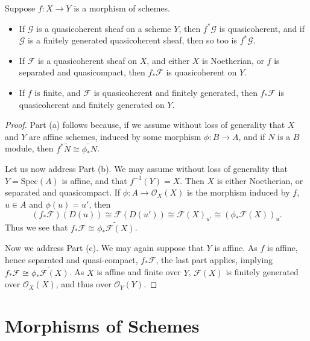 \begin{theorem}
    Suppose $f: X \to Y$ is a morphism of schemes.
    \begin{itemize}
        \item If $\mathcal{G}$ is a quasicoherent sheaf on a scheme $Y$, then $f^* \mathcal{G}$ is quasicoherent, and if $\mathcal{G}$ is a finitely generated quasicoherent sheaf, then so too is $f^* \mathcal{G}$.
        \item If $\mathcal{F}$ is a quasicoherent sheaf on $X$, and either $X$ is Noetherian, or $f$ is separated and quasicompact, then $f_* \mathcal{F}$ is quasicoherent on $Y$.
        \item If $f$ is finite, and $\mathcal{F}$ is quasicoherent and finitely generated, then $f_* \mathcal{F}$ is quasicoherent and finitely generated on $Y$.
    \end{itemize}
\end{theorem}
\begin{proof}
    Part (a) follows because, if we assume without loss of generality that $X$ and $Y$ are affine schemes, induced by some morphism $\phi: B \to A$, and if $N$ is a $B$ module, then $f^* \widetilde{N} \cong \widetilde{\phi_* N}$.

    Let us now address Part (b). We may assume without loss of generality that $Y = \text{Spec}(A)$ is affine, and that $f^{-1}(Y) = X$. Then $X$ is either Noetherian, or separated and quasicompact. If $\phi: A \to \mathcal{O}_X(X)$ is the morphism induced by $f$, $u \in A$ and $\phi(u) = u'$, then
    \[ (f_* \mathcal{F})(D(u)) \cong \mathcal{F}(D(u')) \cong \mathcal{F}(X)_{u'} \cong ( \phi_* \mathcal{F}(X) )_u. \]
    Thus we see that $f_* \mathcal{F} \cong \widetilde{\phi_* \mathcal{F}(X)}$.

    Now we address Part (c). We may again suppose that $Y$ is affine. As $f$ is affine, hence separated and quasi-compact, $f_* \mathcal{F}$, the last part applies, implying $f_* \mathcal{F} \cong \widetilde{\phi_* \mathcal{F}(X)}$. As $X$ is affine and finite over $Y$, $\mathcal{F}(X)$ is finitely generated over $\mathcal{O}_X(X)$, and thus over $\mathcal{O}_Y(Y)$.
\end{proof}











\section{Morphisms of Schemes}

